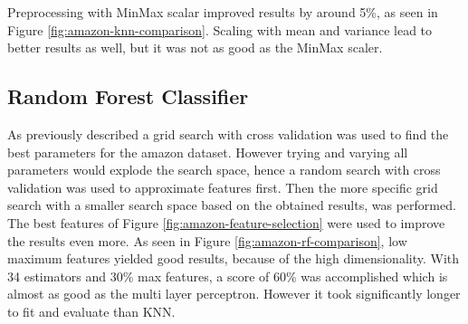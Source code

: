 Preprocessing with MinMax scalar improved results by around 5\%, as seen in Figure \ref{fig:amazon-knn-comparison}.
Scaling with mean and variance lead to better results as well, but it was not as good as the MinMax scaler.




\subsection{Random Forest Classifier}

As previously described a grid search with cross validation was used to find the best parameters for the amazon dataset.
However trying and varying all parameters would explode the search space, hence a random search with cross validation was used to approximate features first.
Then the more specific grid search with a smaller search space based on the obtained results, was performed.
The best features of Figure \ref{fig:amazon-feature-selection} were used to improve the results even more. 
As seen in Figure \ref{fig:amazon-rf-comparison}, low maximum features yielded good results, because of the high dimensionality.
With 34 estimators and 30\% max features, a score of 60\% was accomplished which is almost as good as the multi layer perceptron.
However it took significantly longer to fit and evaluate than KNN.



